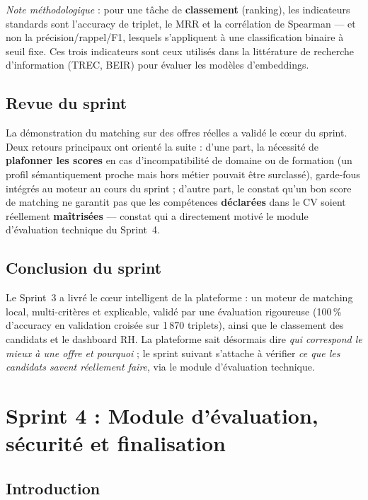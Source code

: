 \documentclass[12pt,a4paper]{report}
\begin{document}
\smallskip
\noindent\textit{Note méthodologique} : pour une tâche de \textbf{classement} (ranking), les indicateurs standards sont l'accuracy de triplet, le MRR et la corrélation de Spearman --- et non la précision/rappel/F1, lesquels s'appliquent à une classification binaire à seuil fixe. Ces trois indicateurs sont ceux utilisés dans la littérature de recherche d'information (TREC, BEIR) pour évaluer les modèles d'embeddings.

\section{Revue du sprint}

La démonstration du matching sur des offres réelles a validé le c\oe ur du sprint. Deux retours principaux ont orienté la suite : d'une part, la nécessité de \textbf{plafonner les scores} en cas d'incompatibilité de domaine ou de formation (un profil sémantiquement proche mais hors métier pouvait être surclassé), garde-fous intégrés au moteur au cours du sprint ; d'autre part, le constat qu'un bon score de matching ne garantit pas que les compétences \textbf{déclarées} dans le CV soient réellement \textbf{maîtrisées} --- constat qui a directement motivé le module d'évaluation technique du Sprint~4.

\section{Conclusion du sprint}

Le Sprint~3 a livré le c\oe ur intelligent de la plateforme : un moteur de matching local, multi-critères et explicable, validé par une évaluation rigoureuse (100\,\% d'accuracy en validation croisée sur 1\,870 triplets), ainsi que le classement des candidats et le dashboard RH. La plateforme sait désormais dire \textit{qui correspond le mieux à une offre et pourquoi} ; le sprint suivant s'attache à vérifier \textit{ce que les candidats savent réellement faire}, via le module d'évaluation technique.
\newpage

\chapter{Sprint 4 : Module d'évaluation, sécurité et finalisation}

\section{Introduction}
\end{document}

